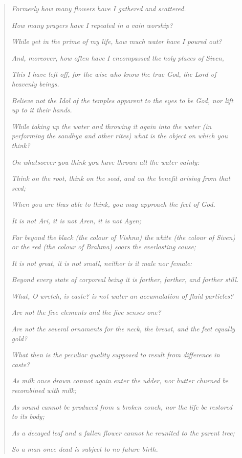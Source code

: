 \documentclass{article}
\begin{document}
\begin{quotation}\small
\emph{Formerly how many flowers have I gathered and scattered.}

\emph{How many prayers have I repeated in a vain worship?}

\emph{While yet in the prime of my life, how much water have I poured out?}

\emph{And, moreover, how often have I encompassed the holy places of Siven,}

\emph{This I have left off, for the wise who know the true God, the Lord of heavenly beings.}

\emph{Believe not the Idol of the temples apparent to the eyes to be God, nor lift up to it their hands.}

\bigskip

\emph{While taking up the water and throwing it again into the water (in performing the sandhya and other rites) what is the object on which you think?}

\emph{On whatsoever you think you have thrown all the water vainly:}

\emph{Think on the root, think on the seed, and on the benefit arising from that seed;}

\emph{When you are thus able to think, you may approach the feet of God.}

\bigskip

\emph{It is not Ari, it is not Aren, it is not Ayen;}

\emph{Far beyond the black (the colour of Vishnu) the white (the colour of Siven) or the red (the colour of Brahma) soars the everlasting cause;}

\emph{It is not great, it is not small, neither is it male nor female:}

\emph{Beyond every state of corporeal being it is farther, farther, and farther still.}

\bigskip

\emph{What, O wretch, is caste? is not water an accumulation of fluid particles?}

\emph{Are not the five elements and the five senses one?}

\emph{Are not the several ornaments for the neck, the breast, and the feet equally gold?}

\emph{What then is the peculiar quality supposed to result from difference in caste?}

\bigskip

\emph{As milk once drawn cannot again enter the udder, nor butter churned be recombined with milk;}

\emph{As sound cannot be produced from a broken conch, nor the life be restored to its body;}

\emph{As a decayed leaf and a fallen flower cannot he reunited to the parent tree;}

\emph{So a man once dead is subject to no future birth.}
\end{quotation}
\end{document}

